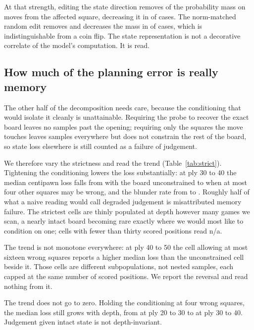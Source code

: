 \documentclass[manuscript, screen, review]{jair}
\theoremstyle{remark}
\begin{document}
At that strength, editing the state direction removes  of
the probability mass on moves from the affected square, decreasing it in
 of  cases. The norm-matched random edit
removes  and decreases the mass in
 of cases, which is indistinguishable from a coin flip.
The state representation is not a decorative correlate of the model's
computation. It is read.

\subsection{How much of the planning error is really memory}
\label{sec:plan}

The other half of the decomposition needs care, because the conditioning that
would isolate it cleanly is unattainable. Requiring the probe to recover the
exact board leaves no samples past the opening; requiring only the squares the
move touches leaves samples everywhere but does not constrain the rest of the
board, so state loss elsewhere is still counted as a failure of judgement.

We therefore vary the strictness and read the trend (Table~\ref{tab:strict}).
Tightening the conditioning lowers the loss substantially: at ply 30 to 40 the
median centipawn loss falls from  with the board
unconstrained to  when at most four other squares may be
wrong, and the blunder rate from  to
. Roughly half of what a naive reading would call
degraded judgement is misattributed memory failure. The strictest cells are thinly
populated at depth however many games we scan, a nearly intact board becoming
rare exactly where we would most like to condition on one; cells with fewer than
thirty scored positions read n/a.



The trend is not monotone everywhere: at ply 40 to 50 the cell allowing at most
sixteen wrong squares reports a higher median loss than the unconstrained cell
beside it. Those cells are different subpopulations, not nested samples, each
capped at the same number of scored positions. We report the reversal and read
nothing from it.

The trend does not go to zero. Holding the conditioning at four wrong squares,
the median loss still grows with depth, from  at ply 20
to 30 to  at ply 30 to 40. Judgement given intact state
is not depth-invariant.
\end{document}

